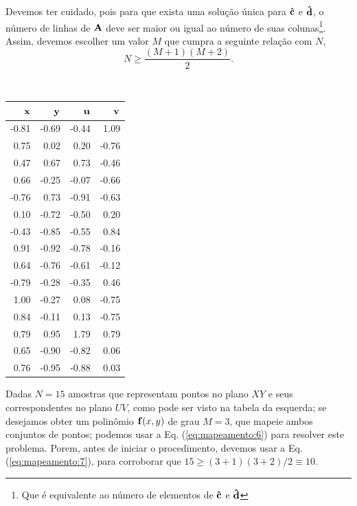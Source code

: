 \begin{theorem}
Devemos ter cuidado, pois para que exista uma solução única para $\VECTOR{\hat{c}}$ e $\VECTOR{\hat{d}}$,
o número de linhas de $\MATRIX{A}$ deve ser maior ou igual ao número de suas colunas\footnote{ Que
é equivalente ao número de elementos de $\VECTOR{\hat{c}}$ e $\VECTOR{\hat{d}}$}.
Assim, devemos escolher um valor $M$ que cumpra a seguinte relação com $N$,
\begin{equation}\label{eq:mapeamento:7}
N\geq \frac{(M+1)(M+2)}{2}.
\end{equation}
\end{theorem}

\begin{example}[ Mapeamento do polinomio 
$\VECTOR{f}(x,y)$ de grau $M=3$, para $N=15$ amostras:] ~\\
\begin{minipage}{0.38\textwidth}
\centering
\begin{tabular}{ |r |r || r |r|}
\hline
   $\VECTOR{x}$ & $\VECTOR{y}$ & $\VECTOR{u}$ & $\VECTOR{v}$ \\ \hline \hline
  -0.81 &-0.69 &-0.44 & 1.09 \\ 
   0.75 & 0.02 & 0.20 &-0.76 \\ 
   0.47 & 0.67 & 0.73 &-0.46 \\ 
   0.66 &-0.25 &-0.07 &-0.66 \\ 
  -0.76 & 0.73 &-0.91 &-0.63 \\ 
   0.10 &-0.72 &-0.50 & 0.20 \\ 
  -0.43 &-0.85 &-0.55 & 0.84 \\ 
   0.91 &-0.92 &-0.78 &-0.16 \\ 
   0.64 &-0.76 &-0.61 &-0.12 \\ 
  -0.79 &-0.28 &-0.35 & 0.46 \\ 
   1.00 &-0.27 & 0.08 &-0.75 \\ 
   0.84 &-0.11 & 0.13 &-0.75 \\ 
   0.79 & 0.95 & 1.79 & 0.79 \\ 
   0.65 &-0.90 &-0.82 & 0.06 \\ 
   0.76 &-0.95 &-0.88 & 0.03 \\ \hline
\end{tabular}
\end{minipage}
\begin{minipage}{0.61\textwidth}
Dadas $N=15$ amostras que representam pontos no plano $XY$ e seus correspondentes 
no plano $UV$, como pode ser visto na tabela da esquerda;
se desejamos obter um polinômio $\VECTOR{f}(x,y)$ de grau $M=3$,
que mapeie ambos conjuntos de pontos; podemos usar a Eq. (\ref{eq:mapeamento:6}) 
para resolver este problema.
Porem, antes de iniciar o procedimento, devemos usar a Eq. (\ref{eq:mapeamento:7}),
para corroborar que $15 \geq (3+1)(3+2)/2\equiv 10$.


\end{minipage}
\end{example}
